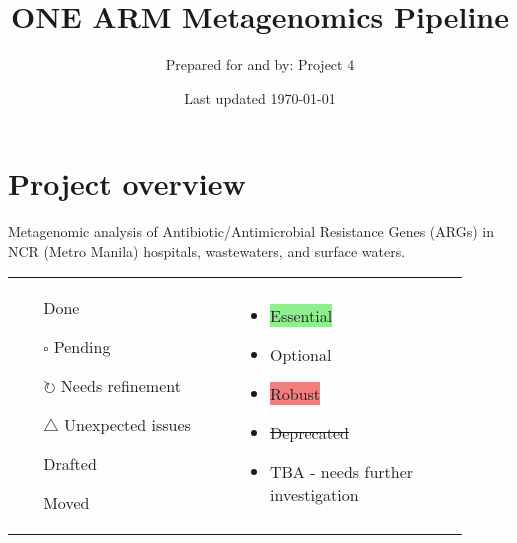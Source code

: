 \documentclass[11pt]{report}
\title{\Huge \textbf{ONE ARM Metagenomics Pipeline}}
\author{\Large Prepared for and by: Project 4}
\date{\Large Last updated \today}
\newcommand{\done}{\checkmark}
\newcommand{\pending}{$\square$}
\newcommand{\refine}{$\circlearrowright$}
\newcommand{\issue}{$\triangle$}
\newcommand{\draft}{\faPencil}
\newcommand{\moved}{\faArrowCircleRight}
\newcommand{\highlightessential}[1]{\colorbox{lightgreen}{#1}}
\newcommand{\highlightoptional}[1]{\colorbox{lightorange}{#1}}
\newcommand{\highlightrobust}[1]{\colorbox{lightcoral}{#1}}
\newcommand{\deprecated}[1]{\sout{#1}}
\begin{document}
	\maketitle
	\thispagestyle{empty}
	
	\newpage
	
\setcounter{tocdepth}{3} 
\tableofcontents
\newpage  %


\pagestyle{fancy}
\fancyhf{}
\fancyhead[C]{\leftmark}  %
\fancyhead[R]{\thepage}

\part{Project overview}


	
	\begin{tcolorbox}
		\raggedright
		\onehalfspacing
		\textbf{} %
		Metagenomic analysis of Antibiotic/Antimicrobial Resistance Genes (ARGs) in NCR (Metro Manila) hospitals, wastewaters, and surface waters.
	\end{tcolorbox}
		
\begin{tcolorbox}[title=Legend, coltitle=AntiqueWhite1]
	\begin{tabular}{p{0.45\linewidth} p{0.45\linewidth}}
		\begin{itemize}
			\item [\done] Done
			\item [\pending] Pending
			\item [\refine] Needs refinement
			\item [\issue] Unexpected issues
			\item [\draft] Drafted
			\item [\moved] Moved
		\end{itemize}
		&
		\begin{itemize}
			\item \highlightessential{Essential}
			\item \highlightoptional{Optional}
			\item \highlightrobust{Robust}
			\item \deprecated{Deprecated}
			\item TBA - needs further investigation
		\end{itemize}
	\end{tabular}
\end{tcolorbox}	
\end{document}
